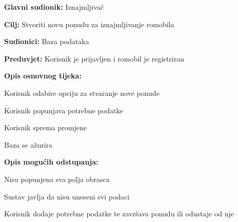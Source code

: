 						\noindent {}
					\begin{packed_item}
	
						\item \textbf{Glavni sudionik: }Iznajmljivač
						\item  \textbf{Cilj: }Stvoriti novu ponudu za iznajmljivanje romobila
						\item  \textbf{Sudionici: }Baza podataka
						\item  \textbf{Preduvjet: }Korisnik je prijavljen i romobil je registriran
						\item  \textbf{Opis osnovnog tijeka:}
						
						\item[] \begin{packed_enum}
	
							\item Korisnik odabire opciju za stvaranje nove ponude
							\item Korisnik popunjava potrebne podatke
							\item Korisnik sprema promjene
							\item Baza se ažurira


						\end{packed_enum}
						
						\item  \textbf{Opis mogućih odstupanja:}
						
						\item[] \begin{packed_item}
	
							\item[2.a] Nisu popunjena sva polja obrasca
							\item[] \begin{packed_enum}
								
								\item Sustav javlja da nisu uneseni svi podaci
								\item Korisnik dodaje potrebne podatke te završava ponudu ili odustaje od nje

								
							\end{packed_enum}
							
						\end{packed_item}						
					\end{packed_item}	





